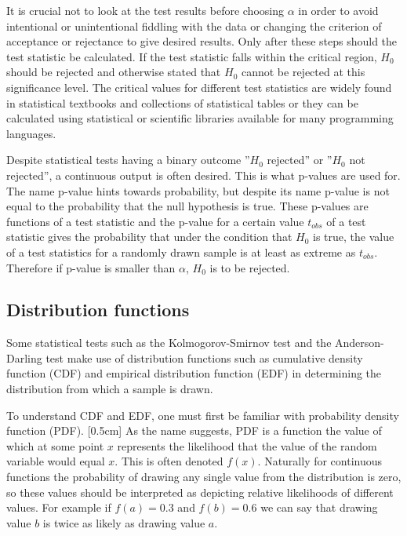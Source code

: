 \documentclass[english, oneside]{HYgradu}
\begin{document}
It is crucial not to look at the test results before choosing $\alpha$ in order to avoid intentional or unintentional fiddling with the data or changing the criterion of acceptance or rejectance to give desired results. Only after these steps should the test statistic be calculated. If the test statistic falls within the critical region, $H_0$ should be rejected and otherwise stated that $H_0$ cannot be rejected at this significance level. The critical values for different test statistics are widely found in statistical textbooks and collections of statistical tables or they can be calculated using statistical or scientific libraries available for many programming languages.

Despite statistical tests having a binary outcome ''$H_0$ rejected'' or ''$H_0$ not rejected'', a continuous output is often desired. This is what p-values are used for. The name p-value hints towards probability, but despite its name p-value is not equal to the probability that the null hypothesis is true. These p-values are functions of a test statistic and the p-value for a certain value $t_{obs}$ of a test statistic gives the probability that under the condition that $H_0$ is true, the value of a test statistics for a randomly drawn sample is at least as extreme as $t_{obs}$. Therefore if p-value is smaller than $\alpha$, $H_0$ is to be rejected.

\subsection{Distribution functions}
\reversemarginpar
{}
Some statistical tests such as the Kolmogorov-Smirnov test and the Anderson-Darling test make use of distribution functions such as cumulative density function (CDF) and empirical distribution function (EDF) in determining the distribution from which a sample is drawn. %

To understand CDF and EDF, one must first be familiar with probability density function (PDF).
\reversemarginpar
{}[0.5cm]
As the name suggests, PDF is a function the value of which at some point $x$ represents the likelihood that the value of the random variable would equal $x$. This is often denoted $f(x)$. Naturally for continuous functions the probability of drawing any single value from the distribution is zero, so these values should be interpreted as depicting relative likelihoods of different values. For example if $f(a)=0.3$ and $f(b)=0.6$ we can say that drawing value $b$ is twice as likely as drawing value $a$. \citep{htk}
\end{document}
